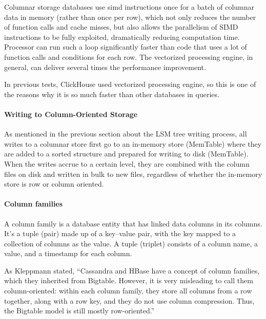 Columnar storage databases use \ac{simd} instructions once for a batch of columnar data in memory (rather than once per row), which not only reduces the number of function calls and cache misses, but also allows the parallelism of SIMD instructions to be fully exploited, dramatically reducing computation time. Processor can run such a loop significantly faster than code that uses a lot of function calls and conditions for each row\cite[p.~99]{kleppmann2017designing}. The vectorized processing engine, in general, can deliver several times the performance improvement. 

In previous tests, ClickHouse used vectorized processing engine, so this is one of the reasons why it is so much faster than other databases in queries.

\paragraph{Writing to Column-Oriented Storage}

As mentioned in the previous section about the LSM tree writing process, all writes to a columnar store first go to an in-memory store (MemTable) where they are added to a sorted structure and prepared for writing to disk (MemTable). When the writes accrue to a certain level, they are combined with the column files on disk and written in bulk to new files, regardless of whether the in-memory store is row or column oriented\cite[p.~101]{kleppmann2017designing}.


\paragraph{Column families}
A column family is a database entity that has linked data columns in its columns. It's a tuple (pair) made up of a key–value pair, with the key mapped to a collection of columns as the value. A tuple (triplet) consists of a column name, a value, and a timestamp for each column\cite{wiki:Column_family}.

As Kleppmann \cite[p.~99]{kleppmann2017designing} stated, \enquote{Cassandra and HBase have a concept of column families, which they inherited from Bigtable. However, it is very misleading to call them column-oriented: within each column family, they store all columns from a row together, along with a row key, and they do not use column compression. Thus, the Bigtable model is still mostly row-oriented.}


